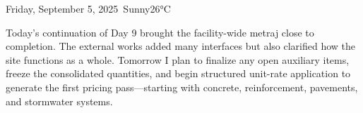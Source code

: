 \begin{dailyentry}{Friday, September 5, 2025}{\weathersunny\ Sunny}{26°C}
\begin{dailynotes}
Today’s continuation of Day 9 brought the facility-wide metraj close to completion. The external works added many interfaces but also clarified how the site functions as a whole. Tomorrow I plan to finalize any open auxiliary items, freeze the consolidated quantities, and begin structured unit-rate application to generate the first pricing pass—starting with concrete, reinforcement, pavements, and stormwater systems.
\end{dailynotes}

\begin{approvalsection}
\end{approvalsection}

\end{dailyentry}
